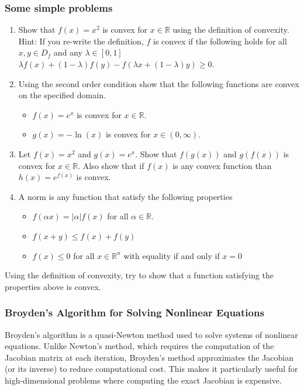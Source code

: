 \documentclass{beamer}
\begin{document}
\begin{frame}
\frametitle{Some simple problems}

\begin{enumerate}
\item Show that $f(x)=x^2$ is convex for $x \in \mathbb{R}$ using the definition of convexity. Hint: If you re-write the definition, $f$ is convex if the following holds for all $x,y \in D_f$ and any $\lambda \in [0,1]$ $\lambda f(x)+(1-\lambda)f(y)-f(\lambda x + (1-\lambda) y ) \geq 0$.

\item Using the second order condition show that the following functions are convex on the specified domain.
\begin{itemize}

 \item $f(x) = e^x$ is convex for $x \in \mathbb{R}$.

 \item $g(x) = -\ln(x)$ is convex for $x \in (0,\infty)$.

\end{itemize}

\noindent
\item Let $f(x) = x^2$ and $g(x) = e^x$. Show that $f(g(x))$ and $g(f(x))$ is convex for $x \in \mathbb{R}$. Also show that if $f(x)$ is any convex function than $h(x) = e^{f(x)}$ is convex.

\item A norm is any function that satisfy the following properties
\begin{itemize}

 \item $f(\alpha x) = |\alpha| f(x)$ for all $\alpha \in \mathbb{R}$.

 \item $f(x+y) \leq f(x) + f(y)$

 \item $f(x) \leq 0$ for all $x \in \mathbb{R}^n$ with equality if and only if $x = 0$
\end{itemize}

\noindent
\end{enumerate}

\noindent
Using the definition of convexity, try to show that a function satisfying the properties above is convex.
\end{frame}

\begin{frame}
\frametitle{Broyden’s Algorithm for Solving Nonlinear Equations}

Broyden’s algorithm is a quasi-Newton method used to solve systems of
nonlinear equations. Unlike Newton’s method, which requires the
computation of the Jacobian matrix at each iteration, Broyden’s method
approximates the Jacobian (or its inverse) to reduce computational
cost. This makes it particularly useful for high-dimensional problems
where computing the exact Jacobian is expensive.
\end{frame}
\end{document}
